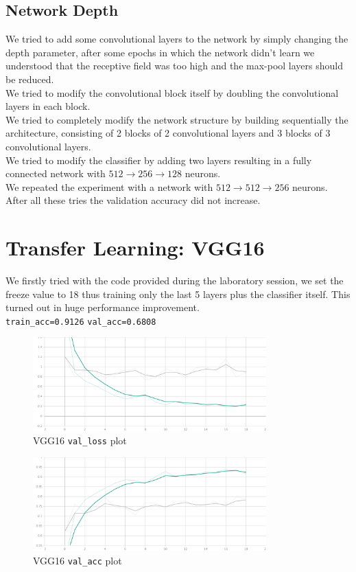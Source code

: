 \documentclass{article}
\begin{document}
	\subsection{Network Depth}
	We tried to add some convolutional layers to the network by simply changing the depth parameter, after some epochs in which the network didn't learn we understood that the receptive field was too high and the max-pool layers should be reduced. \\
	We tried to modify the convolutional block itself by doubling the convolutional layers in each block.\\
	We tried to completely modify the network structure by building sequentially the architecture, consisting of 2 blocks of 2 convolutional layers  and 3 blocks of 3 convolutional layers. \\
	We tried to modify the classifier by adding two layers resulting in a fully connected network with \(512 \rightarrow 256 \rightarrow 128\) neurons.\\
	We repeated the experiment with a network with \(512 \rightarrow 512 \rightarrow 256\) neurons.\\
	After all these tries the validation accuracy did not increase.
	
	\section{Transfer Learning: VGG16}
		We firstly tried with the code provided during the laboratory session, we set the freeze value to 18 thus training only the last 5 layers plus the classifier itself. This turned out in huge performance improvement. \\
		\texttt{train\_acc=0.9126}
		\texttt{val\_acc=0.6808}
		
		\begin{figure}[H]
			\centering
			\includegraphics[width=9cm, keepaspectratio]{VGG_LOSS.jpg}
			\caption{VGG16 \texttt{val\_loss} plot}
		\end{figure}
	
		\begin{figure}[H]
			\centering
			\includegraphics[width=9cm, keepaspectratio]{VGG_ACC.jpg}
			\caption{VGG16 \texttt{val\_acc} plot}
		\end{figure}
		
\end{document}
